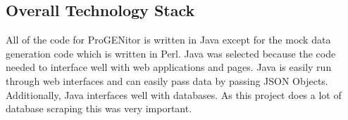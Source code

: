 \subsection{Overall Technology Stack}
All of the code for ProGENitor is written in Java except for the mock data
generation code which is written in Perl.  Java was selected because the code
needed to interface well with web applications and pages.  Java is easily run through
web interfaces and can easily pass data by passing JSON Objects.  Additionally,
Java interfaces well with databases.  As this project does a lot of database
scraping this was very important.
